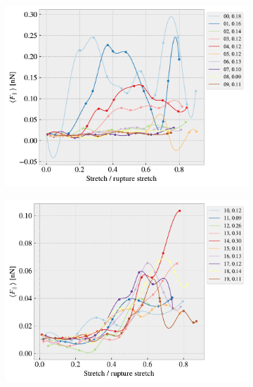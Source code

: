 \begin{figure}[H]
    \centering
    \begin{subfigure}[b]{0.49\textwidth}
        \centering
        \includegraphics[width=\textwidth]{figures/stretch_profiles/RW/SP_0_RW.pdf}
        \caption{}
        \label{fig:}
    \end{subfigure}
    \hfill
    \begin{subfigure}[b]{0.49\textwidth}
        \centering
        \includegraphics[width=\textwidth]{figures/stretch_profiles/RW/SP_1_RW.pdf}
        \caption{}
        \label{fig:}
    \end{subfigure}
    \hfill
    \begin{subfigure}[b]{0.49\textwidth}

\end{subfigure}
\end{figure}
